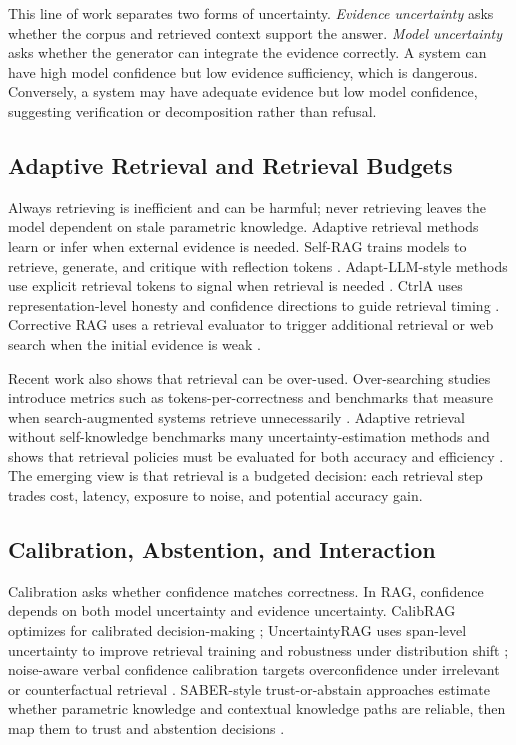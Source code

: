 \documentclass[11pt]{article}
\begin{document}
This line of work separates two forms of uncertainty. \emph{Evidence uncertainty} asks whether the corpus and retrieved context support the answer. \emph{Model uncertainty} asks whether the generator can integrate the evidence correctly. A system can have high model confidence but low evidence sufficiency, which is dangerous. Conversely, a system may have adequate evidence but low model confidence, suggesting verification or decomposition rather than refusal.

\subsection{Adaptive Retrieval and Retrieval Budgets}

Always retrieving is inefficient and can be harmful; never retrieving leaves the model dependent on stale parametric knowledge. Adaptive retrieval methods learn or infer when external evidence is needed. Self-RAG trains models to retrieve, generate, and critique with reflection tokens \citep{selfRAG2023}. Adapt-LLM-style methods use explicit retrieval tokens to signal when retrieval is needed \citep{whenToRetrieve2024}. CtrlA uses representation-level honesty and confidence directions to guide retrieval timing \citep{ctrla2025}. Corrective RAG uses a retrieval evaluator to trigger additional retrieval or web search when the initial evidence is weak \citep{crag2024}.

Recent work also shows that retrieval can be over-used. Over-searching studies introduce metrics such as tokens-per-correctness and benchmarks that measure when search-augmented systems retrieve unnecessarily \citep{rrag006}. Adaptive retrieval without self-knowledge benchmarks many uncertainty-estimation methods and shows that retrieval policies must be evaluated for both accuracy and efficiency \citep{rrag034}. The emerging view is that retrieval is a budgeted decision: each retrieval step trades cost, latency, exposure to noise, and potential accuracy gain.

\subsection{Calibration, Abstention, and Interaction}

Calibration asks whether confidence matches correctness. In RAG, confidence depends on both model uncertainty and evidence uncertainty. CalibRAG optimizes for calibrated decision-making \citep{calibRAG2025}; UncertaintyRAG uses span-level uncertainty to improve retrieval training and robustness under distribution shift \citep{uncertaintyRAG2024}; noise-aware verbal confidence calibration targets overconfidence under irrelevant or counterfactual retrieval \citep{rrag007}. SABER-style trust-or-abstain approaches estimate whether parametric knowledge and contextual knowledge paths are reliable, then map them to trust and abstention decisions \citep{rrag002}.
\end{document}
